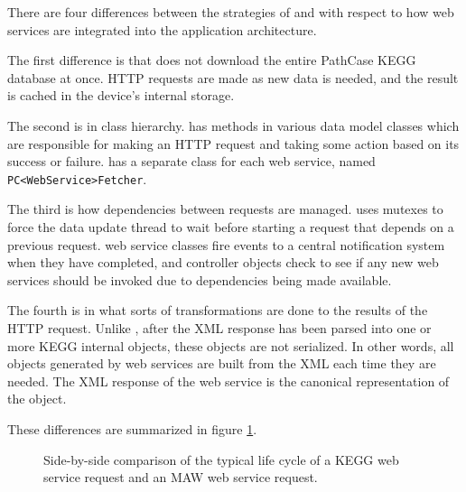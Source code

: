 There are four differences between the strategies of \mawapp and \keggapp
with respect to how web services are integrated into the application
architecture.

The first difference is that \keggapp does not download the entire PathCase
KEGG database at once. HTTP requests are made as new data is needed, and the
result is cached in the device's internal storage.

The second is in class hierarchy. \mawapp has methods in various data model
classes which are responsible for making an HTTP request and taking some action
based on its success or failure. \keggapp has a separate class for each web
service, named \texttt{PC<WebService>Fetcher}.

The third is how dependencies between requests are managed. \mawapp uses
mutexes to force the data update thread to wait before starting a request that
depends on a previous request. \keggappp web service classes fire events to
a central notification system when they have completed, and controller objects
check to see if any new web services should be invoked due to dependencies being
made available.

The fourth is in what sorts of transformations are done to the results of the
HTTP request. Unlike \mawapp, after the XML response has been parsed into
one or more KEGG internal objects, these objects are not serialized. In other
words, all objects generated by web services are built from the XML each time
they are needed. The XML response of the web service is the canonical
representation of the object.

These differences are summarized in figure
\ref{fig:kegg_impl_web_service_differences}.

\begin{figure}[hbt]
    \caption{\label{fig:kegg_impl_web_service_differences} Side-by-side
    comparison of the typical life cycle of a KEGG web service request and an
    MAW web service request.}
\end{figure}


